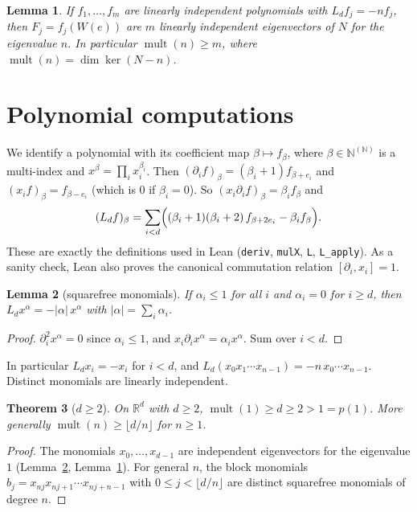 \documentclass[11pt]{article}
\newtheorem{theorem}{Theorem}
\newtheorem{lemma}[theorem]{Lemma}
\theoremstyle{definition}
\theoremstyle{remark}
\newcommand{\N}{\mathbb{N}}
\newcommand{\R}{\mathbb{R}}
\newcommand{\mult}{\operatorname{mult}}
\begin{document}
\begin{lemma}\label{lem:transfer}
If $f_1,\dots,f_m$ are linearly independent polynomials with $L_df_j=-nf_j$, then
$F_j=f_j(W(e))$ are $m$ linearly independent eigenvectors of $N$ for the eigenvalue $n$.
In particular $\mult(n)\ge m$, where $\mult(n)=\dim\ker(N-n)$.
\end{lemma}

\section{Polynomial computations}
We identify a polynomial with its coefficient map $\beta\mapsto f_\beta$, where
$\beta\in\N^{(\N)}$ is a multi-index and $x^\beta=\prod_i x_i^{\beta_i}$. Then
$(\partial_if)_\beta=(\beta_i+1)f_{\beta+e_i}$ and $(x_if)_\beta=f_{\beta-e_i}$ (which
is $0$ if $\beta_i=0$). So $(x_i\partial_if)_\beta=\beta_if_\beta$ and
\begin{equation}\label{eq:coef}
(L_df)_\beta=\sum_{i<d}\Bigl((\beta_i+1)(\beta_i+2)\,f_{\beta+2e_i}-\beta_i f_\beta\Bigr).
\end{equation}
These are exactly the definitions used in Lean (\texttt{deriv}, \texttt{mulX},
\texttt{L}, \texttt{L\_apply}). As a sanity check, Lean also proves the canonical
commutation relation $[\partial_i,x_i]=1$.

\begin{lemma}[squarefree monomials]\label{lem:sqfree}
If $\alpha_i\le1$ for all $i$ and $\alpha_i=0$ for $i\ge d$, then
$L_dx^\alpha=-|\alpha|\,x^\alpha$ with $|\alpha|=\sum_i\alpha_i$.
\end{lemma}
\begin{proof}
$\partial_i^2x^\alpha=0$ since $\alpha_i\le1$, and $x_i\partial_ix^\alpha=\alpha_ix^\alpha$.
Sum over $i<d$.
\end{proof}
In particular $L_dx_i=-x_i$ for $i<d$, and $L_d(x_0x_1\cdots x_{n-1})=-n\,x_0\cdots x_{n-1}$.
Distinct monomials are linearly independent.

\begin{theorem}[$d\ge2$]\label{thm:dge2}
On $\R^d$ with $d\ge2$, $\mult(1)\ge d\ge2>1=p(1)$. More generally
$\mult(n)\ge\lfloor d/n\rfloor$ for $n\ge1$.
\end{theorem}
\begin{proof}
The monomials $x_0,\dots,x_{d-1}$ are independent eigenvectors for the eigenvalue $1$
(Lemma~\ref{lem:sqfree}, Lemma~\ref{lem:transfer}). For general $n$, the block monomials
$b_j=x_{nj}x_{nj+1}\cdots x_{nj+n-1}$ with $0\le j<\lfloor d/n\rfloor$ are distinct
squarefree monomials of degree $n$.
\end{proof}
\end{document}
